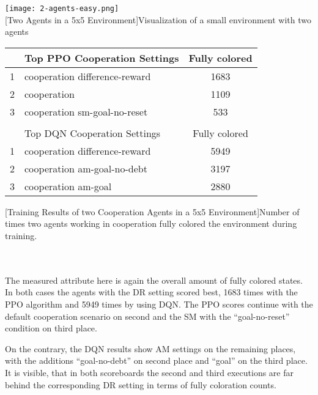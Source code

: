 \begin{minipage}{\textwidth}
  \begin{minipage}[b]{0.29\textwidth}
    \centering
    \texttt{[image: 2-agents-easy.png]}\\
    [Two Agents in a 5x5 Environment]{Visualization of a small environment with two agents}\label{fig:2-coop-easy}
  \end{minipage}
  \hfill
    \begin{minipage}[b]{0.69\textwidth}
    \centering
    \begin{tabular}{clc}\hline
         & Top PPO Cooperation Settings & Fully colored \\ \hline
        {\small 1} & cooperation difference-reward & 1683 \\
        {\small 2} & cooperation & 1109 \\
        {\small 3} & cooperation sm-goal-no-reset & 533 \\ \hline
         &   \\ \hline
         & Top DQN Cooperation Settings & Fully colored \\ \hline
        {\small 1} & cooperation difference-reward & 5949 \\
        {\small 2} & cooperation am-goal-no-debt & 3197 \\
        {\small 3} & cooperation am-goal & 2880 \\ \hline
        \end{tabular}
        [Training Results of two Cooperation Agents in a 5x5 Environment]{Number of times two agents working in cooperation fully colored the environment during training.}\label{t:2-coop-easy}
    \end{minipage}
  \end{minipage}\\\\

The measured attribute here is again the overall amount of fully colored states. In both cases the agents with the DR setting scored best, 1683 times with the PPO algorithm and 5949 times by using DQN. The PPO scores continue with the default cooperation scenario on second and the SM with the ``goal-no-reset'' condition on third place. 

On the contrary, the DQN results show AM settings on the remaining places, with the additions ``goal-no-debt'' on second place and ``goal'' on the third place. It is visible, that in both scoreboards the second and third executions are far behind the corresponding DR setting in terms of fully coloration counts.


